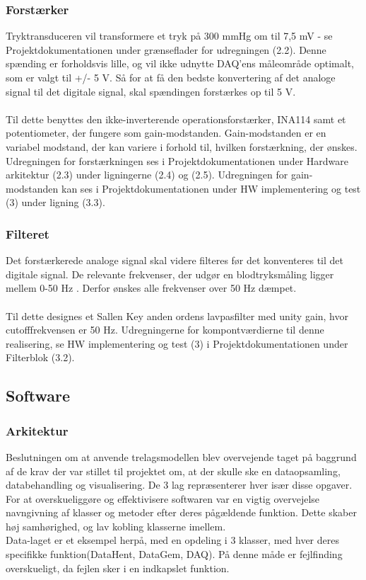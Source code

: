 \subsubsection{Forstærker}
Tryktransduceren vil transformere et tryk på 300 mmHg om til 7,5 mV - se Projektdokumentationen under grænseflader for udregningen (2.2). Denne spænding er forholdsvis lille, og vil ikke udnytte DAQ'ens måleområde optimalt, som er valgt til +/- 5 V. Så for at få den bedste konvertering af det analoge signal til det digitale signal, skal spændingen forstærkes op til 5 V. 
\\\\
Til dette benyttes den ikke-inverterende operationsforstærker, INA114 samt et potentiometer, der fungere som gain-modstanden. Gain-modstanden er en variabel modstand, der kan variere i forhold til, hvilken forstærkning, der ønskes. Udregningen for forstærkningen ses i Projektdokumentationen under Hardware arkitektur (2.3) under ligningerne (2.4) og (2.5). Udregningen for gain-modstanden kan ses i Projektdokumentationen under HW implementering og test (3) under ligning (3.3).     

\subsubsection{Filteret}
Det forstærkerede analoge signal skal videre filteres før det konventeres til det digitale signal. De relevante frekvenser, der udgør en blodtryksmåling ligger mellem 0-50 Hz \cite[s. 10]{Billed for invasiv blodtryksmaling} . Derfor ønskes alle frekvenser over 50 Hz dæmpet.
\\\\
Til dette designes et Sallen Key anden ordens lavpasfilter med unity gain, hvor cutofffrekvensen er 50 Hz. Udregningerne for kompontværdierne til denne realisering, se HW implementering og test (3) i Projektdokumentationen under Filterblok (3.2).

\subsection{Software} 
\subsubsection{Arkitektur}
Beslutningen om at anvende trelagsmodellen blev overvejende taget på baggrund af de krav der var stillet til projektet om, at der skulle ske en dataopsamling, databehandling og visualisering. De 3 lag repræsenterer hver især disse opgaver. 
For at overskueliggøre og effektivisere softwaren var en vigtig overvejelse navngivning af klasser og metoder efter deres pågældende funktion. Dette skaber høj samhørighed, og lav kobling klasserne imellem.\\
Data-laget er et eksempel herpå, med en opdeling i 3 klasser, med hver deres specifikke funktion(DataHent, DataGem, DAQ). På denne måde er fejlfinding overskueligt, da fejlen sker i en indkapslet funktion.

